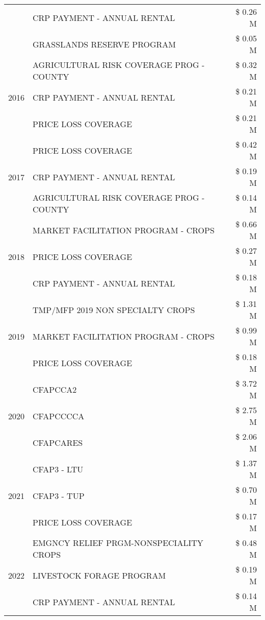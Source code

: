 \begin{tabular}{llr}
 & CRP PAYMENT - ANNUAL RENTAL & \$ 0.26 M \\
 & GRASSLANDS RESERVE PROGRAM & \$ 0.05 M \\
\cline{1-3}
\multirow[t]{3}{*}{2016} & AGRICULTURAL RISK COVERAGE PROG - COUNTY & \$ 0.32 M \\
 & CRP PAYMENT - ANNUAL RENTAL & \$ 0.21 M \\
 & PRICE LOSS COVERAGE & \$ 0.21 M \\
\cline{1-3}
\multirow[t]{3}{*}{2017} & PRICE LOSS COVERAGE & \$ 0.42 M \\
 & CRP PAYMENT - ANNUAL RENTAL & \$ 0.19 M \\
 & AGRICULTURAL RISK COVERAGE PROG - COUNTY & \$ 0.14 M \\
\cline{1-3}
\multirow[t]{3}{*}{2018} & MARKET FACILITATION PROGRAM - CROPS & \$ 0.66 M \\
 & PRICE LOSS COVERAGE & \$ 0.27 M \\
 & CRP PAYMENT - ANNUAL RENTAL & \$ 0.18 M \\
\cline{1-3}
\multirow[t]{3}{*}{2019} & TMP/MFP 2019 NON SPECIALTY CROPS & \$ 1.31 M \\
 & MARKET FACILITATION PROGRAM - CROPS & \$ 0.99 M \\
 & PRICE LOSS COVERAGE & \$ 0.18 M \\
\cline{1-3}
\multirow[t]{3}{*}{2020} & CFAPCCA2 & \$ 3.72 M \\
 & CFAPCCCCA & \$ 2.75 M \\
 & CFAPCARES & \$ 2.06 M \\
\cline{1-3}
\multirow[t]{3}{*}{2021} & CFAP3 - LTU & \$ 1.37 M \\
 & CFAP3 - TUP & \$ 0.70 M \\
 & PRICE LOSS COVERAGE & \$ 0.17 M \\
\cline{1-3}
\multirow[t]{3}{*}{2022} & EMGNCY RELIEF PRGM-NONSPECIALITY CROPS & \$ 0.48 M \\
 & LIVESTOCK FORAGE PROGRAM & \$ 0.19 M \\
 & CRP PAYMENT - ANNUAL RENTAL & \$ 0.14 M \\
\cline{1-3}
\bottomrule
\end{tabular}
